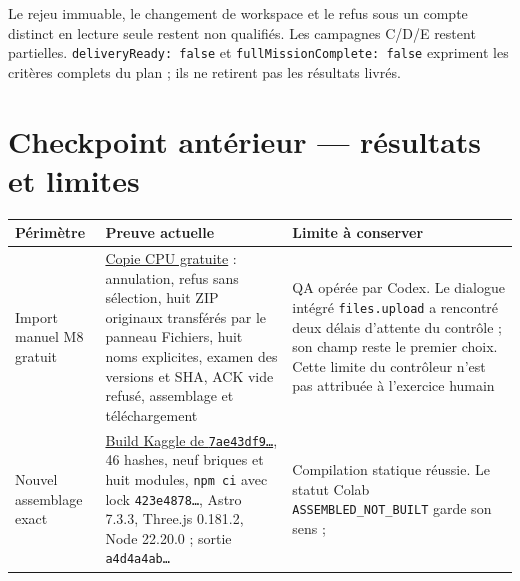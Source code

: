 \documentclass[
  canadien,
  11pt,
  a4paper,
]{report}
\newcounter{none} %
\begin{document}
Le rejeu immuable, le changement de workspace et le refus sous un compte
distinct en lecture seule restent non qualifiés. Les campagnes C/D/E
restent partielles. \texttt{delivery\allowbreak{}Ready:\ false} et
\texttt{full\allowbreak{}Mission\allowbreak{}Complete:\ false} expriment les critères complets du
plan ; ils ne retirent pas les résultats livrés.

\section{Checkpoint antérieur --- résultats et
limites}\label{checkpoint-antuxe9rieur-ruxe9sultats-et-limites}

{\def\LTcaptype{none} %
\begin{longtable}[]{@{}
  >{\raggedright\arraybackslash}p{}
  >{\raggedright\arraybackslash}p{}
  >{\raggedright\arraybackslash}p{}@{}}
\toprule\noalign{}
\begin{minipage}[b]{\linewidth}\raggedright
Périmètre
\end{minipage} & \begin{minipage}[b]{\linewidth}\raggedright
Preuve actuelle
\end{minipage} & \begin{minipage}[b]{\linewidth}\raggedright
Limite à conserver
\end{minipage} \\
\midrule\noalign{}
\endhead
\bottomrule\noalign{}
\endlastfoot
Import manuel M8 gratuit &
\href{../../../../receipts/formation/free-colab-module-8-manual-import-assembled.json}{Copie
CPU gratuite} : annulation, refus sans sélection, huit ZIP originaux
transférés par le panneau Fichiers, huit noms explicites, examen des
versions et SHA, ACK vide refusé, assemblage et téléchargement & QA
opérée par Codex. Le dialogue intégré \texttt{files.upload} a rencontré
deux délais d'attente du contrôle ; son champ reste le premier choix.
Cette limite du contrôleur n'est pas attribuée à l'exercice humain \\
Nouvel assemblage exact &
\href{../../../../receipts/formation/actual-manual-import-assembly-static-kaggle.json}{Build
Kaggle de \texttt{7ae43df9…}}, 46 hashes, neuf briques et huit modules,
\texttt{npm\ ci} avec lock \texttt{423e4878…}, Astro 7.3.3, Three.js
0.181.2, Node 22.20.0 ; sortie \texttt{a4d4a4ab…} & Compilation statique
réussie. Le statut Colab \texttt{ASSEMBLED\_\allowbreak{}NOT\_\allowbreak{}BUILT} garde son sens ;

\end{longtable}}
\end{document}
